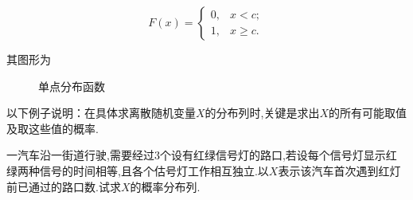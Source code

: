 \begin{solution}
	\begin{equation}
	  F(x)= \begin{cases}
	   0, &  x < c; \\
	   1, &  x \geqslant c.
	\end{cases}  \label{eq:2.1.3}
	\end{equation}
	
	其图形为
	\begin{figure}[!ht]
  \centering
{}
  \caption{单点分布函数}\label{fig:2.1.4}
\end{figure}

\end{solution}

以下例子说明：在具体求离散随机变量$ X $的分布列时,关键是求出$ X $的所有可能取值及取这些值的概率.

\begin{example}
	一汽车沿一街道行驶,需要经过3个设有红绿信号灯的路口,若设每个信号灯显示红绿两种信号的时间相等,且各个估号灯工作相互独立.以$X$表示该汽车首次遇到红灯前已通过的路口数.试求$ X $的概率分布列.
\end{example}

